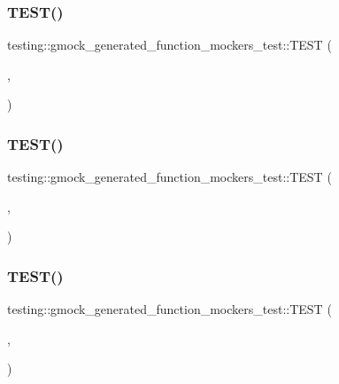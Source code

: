 \subsubsection{\texorpdfstring{TEST()}{TEST()}\hspace{0.1cm}{\footnotesize\ttfamily [4/11]}}
{\footnotesize\ttfamily testing\+::gmock\+\_\+generated\+\_\+function\+\_\+mockers\+\_\+test\+::\+T\+E\+ST (\begin{DoxyParamCaption}\item[{Overloaded\+Mock\+Method\+Test}]{,  }\item[{Can\+Overload\+On\+Arg\+Number\+In\+Macro\+Body}]{ }\end{DoxyParamCaption})}

\mbox{\label{namespacetesting_1_1gmock__generated__function__mockers__test_aa58ec93a77bee21244c10da2bc8cf70e}} 
\subsubsection{\texorpdfstring{TEST()}{TEST()}\hspace{0.1cm}{\footnotesize\ttfamily [5/11]}}
{\footnotesize\ttfamily testing\+::gmock\+\_\+generated\+\_\+function\+\_\+mockers\+\_\+test\+::\+T\+E\+ST (\begin{DoxyParamCaption}\item[{Overloaded\+Mock\+Method\+Test}]{,  }\item[{Can\+Overload\+On\+Constness\+In\+Macro\+Body}]{ }\end{DoxyParamCaption})}

\mbox{\label{namespacetesting_1_1gmock__generated__function__mockers__test_a8d67aadbc04fee7e2afc10ee91a76b74}} 
\subsubsection{\texorpdfstring{TEST()}{TEST()}\hspace{0.1cm}{\footnotesize\ttfamily [6/11]}}
{\footnotesize\ttfamily testing\+::gmock\+\_\+generated\+\_\+function\+\_\+mockers\+\_\+test\+::\+T\+E\+ST (\begin{DoxyParamCaption}\item[{Mock\+Function\+Test}]{,  }\item[{Works\+For\+Void\+Nullary}]{ }\end{DoxyParamCaption})}

